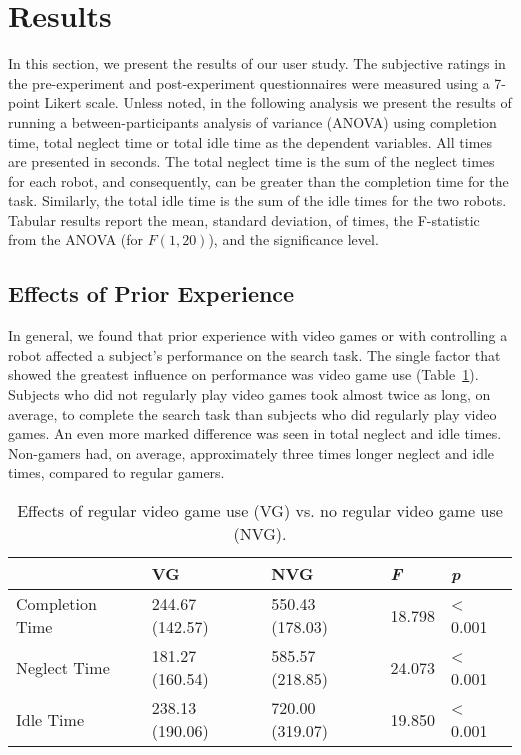 \section{Results}
\label{sec:study-results}
In this section, we present the results of our user study. The subjective ratings in the pre-experiment and post-experiment questionnaires were measured using a 7-point Likert scale. Unless noted, in the following analysis we present the results of running a between-participants analysis of variance (ANOVA) using completion time, total neglect time or total idle time as the dependent variables. All times are presented in seconds. The total neglect time is the sum of the neglect times for each robot, and consequently, can be greater than the completion time for the task. Similarly, the total idle time is the sum of the idle times for the two robots. Tabular results report the mean, standard deviation, of times, the F-statistic from the ANOVA (for $F(1,20)$), and the significance level. 

\subsection{Effects of Prior Experience} %
\label{sub:effects_of_prior_experience}
In general, we found that prior experience with video games or with controlling a robot affected a subject’s performance on the search task. The single factor that showed the greatest influence on performance was video game use (Table~\ref{tab:prior-vg}). Subjects who did not regularly play video games took almost twice as long, on average, to complete the search task than subjects who did regularly play video games. An even more marked difference was seen in total neglect and idle times. Non-gamers had, on average, approximately three times longer neglect and idle times, compared to regular gamers.


\begin{table}[ht]
\label{tab:prior-vg}
\begin{center}
	\begin{tabular}{| l | l | l | l | l |}
	\hline
		& \textbf{VG} & \textbf{NVG} & \emph{F} & \emph{p}\\ \hline
		Completion Time & 244.67 (142.57) & 550.43 (178.03) & 18.798 & < 0.001\\ \hline
		Neglect Time & 181.27 (160.54) & 585.57 (218.85) & 24.073 & < 0.001\\ \hline
		Idle Time & 238.13 (190.06) & 720.00 (319.07) & 19.850 & < 0.001\\ \hline
	\hline
	\end{tabular}
	\caption{Effects of regular video game use (VG) vs. no regular video game use (NVG).}
\end{center}
\end{table}


